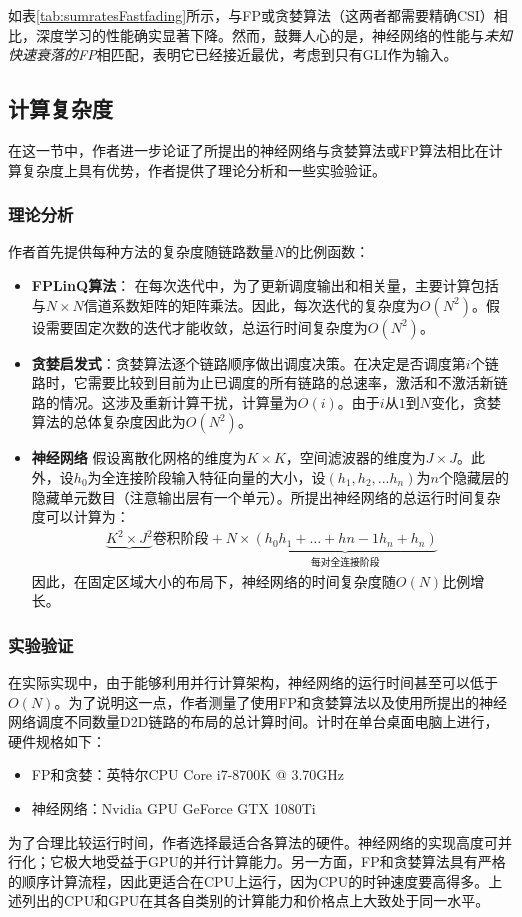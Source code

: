 \documentclass[UTF8, 12pt]{article}
\numberwithin{figure}{section}
\begin{document}
如表\ref{tab:sumratesFastfading}所示，与FP或贪婪算法（这两者都需要精确CSI）相比，深度学习的性能确实显著下降。然而，鼓舞人心的是，神经网络的性能与\emph{未知快速衰落的FP}相匹配，表明它已经接近最优，考虑到只有GLI作为输入。

\subsection{计算复杂度}

在这一节中，作者进一步论证了所提出的神经网络与贪婪算法或FP算法相比在计算复杂度上具有优势，作者提供了理论分析和一些实验验证。

\subsubsection{理论分析}
作者首先提供每种方法的复杂度随链路数量$N$的比例函数：
\begin{itemize}
\item \textbf{FPLinQ算法}：
在每次迭代中，为了更新调度输出和相关量，主要计算包括与$N\times N$信道系数矩阵的矩阵乘法。因此，每次迭代的复杂度为$O(N^2)$。假设需要固定次数的迭代才能收敛，总运行时间复杂度为$O(N^2)$。
\item \textbf{贪婪启发式}：贪婪算法逐个链路顺序做出调度决策。在决定是否调度第$i$个链路时，它需要比较到目前为止已调度的所有链路的总速率，激活和不激活新链路的情况。这涉及重新计算干扰，计算量为$O(i)$。由于$i$从$1$到$N$变化，贪婪算法的总体复杂度因此为$O(N^2)$。
\item \textbf{神经网络} 假设离散化网格的维度为$K\times K$，空间滤波器的维度为$J\times J$。此外，设$h_0$为全连接阶段输入特征向量的大小，设$(h_1, h_2,...h_n)$为$n$个隐藏层的隐藏单元数目（注意输出层有一个单元）。所提出神经网络的总运行时间复杂度可以计算为：
\begin{align}
\underbrace{K^2 \times J^2}{\text{卷积阶段}} + N \times
\underbrace{(h_0h_1 + \dots + h{n-1}h_{n} + h_{n})}_{\text{每对全连接阶段}}
\end{align}
因此，在固定区域大小的布局下，神经网络的时间复杂度随$O(N)$比例增长。
\end{itemize}

\subsubsection{实验验证}
在实际实现中，由于能够利用并行计算架构，神经网络的运行时间甚至可以低于$O(N)$。为了说明这一点，作者测量了使用FP和贪婪算法以及使用所提出的神经网络调度不同数量D2D链路的布局的总计算时间。计时在单台桌面电脑上进行，硬件规格如下：
\begin{itemize}
\item FP和贪婪：英特尔CPU Core i7-8700K @ 3.70GHz
\item 神经网络：Nvidia GPU GeForce GTX 1080Ti
\end{itemize}
为了合理比较运行时间，作者选择最适合各算法的硬件。神经网络的实现高度可并行化；它极大地受益于GPU的并行计算能力。另一方面，FP和贪婪算法具有严格的顺序计算流程，因此更适合在CPU上运行，因为CPU的时钟速度要高得多。上述列出的CPU和GPU在其各自类别的计算能力和价格点上大致处于同一水平。
\end{document}
